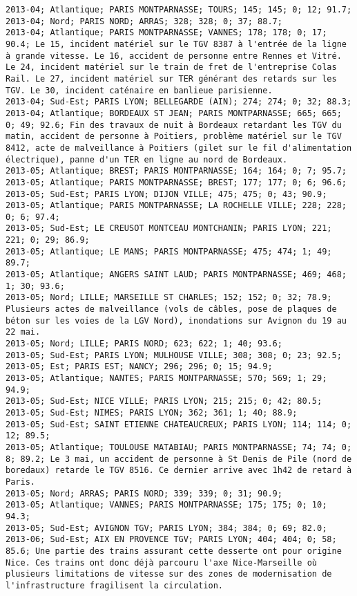 \documentclass{article}
\begin{document}
\begin{Verbatim}[commandchars=\\\{\}]
2013-04; Atlantique; PARIS MONTPARNASSE; TOURS; 145; 145; 0; 12; 91.7; 
2013-04; Nord; PARIS NORD; ARRAS; 328; 328; 0; 37; 88.7; 
2013-04; Atlantique; PARIS MONTPARNASSE; VANNES; 178; 178; 0; 17; 90.4; Le 15, incident matériel sur le TGV 8387 à l'entrée de la ligne à grande vitesse. Le 16, accident de personne entre Rennes et Vitré. Le 24, incident matériel sur le train de fret de l'entreprise Colas Rail. Le 27, incident matériel sur TER générant des retards sur les TGV. Le 30, incident caténaire en banlieue parisienne.
2013-04; Sud-Est; PARIS LYON; BELLEGARDE (AIN); 274; 274; 0; 32; 88.3; 
2013-04; Atlantique; BORDEAUX ST JEAN; PARIS MONTPARNASSE; 665; 665; 0; 49; 92.6; Fin des travaux de nuit à Bordeaux retardant les TGV du matin, accident de personne à Poitiers, problème matériel sur le TGV 8412, acte de malveillance à Poitiers (gilet sur le fil d'alimentation électrique), panne d'un TER en ligne au nord de Bordeaux.
2013-05; Atlantique; BREST; PARIS MONTPARNASSE; 164; 164; 0; 7; 95.7; 
2013-05; Atlantique; PARIS MONTPARNASSE; BREST; 177; 177; 0; 6; 96.6; 
2013-05; Sud-Est; PARIS LYON; DIJON VILLE; 475; 475; 0; 43; 90.9; 
2013-05; Atlantique; PARIS MONTPARNASSE; LA ROCHELLE VILLE; 228; 228; 0; 6; 97.4; 
2013-05; Sud-Est; LE CREUSOT MONTCEAU MONTCHANIN; PARIS LYON; 221; 221; 0; 29; 86.9; 
2013-05; Atlantique; LE MANS; PARIS MONTPARNASSE; 475; 474; 1; 49; 89.7; 
2013-05; Atlantique; ANGERS SAINT LAUD; PARIS MONTPARNASSE; 469; 468; 1; 30; 93.6; 
2013-05; Nord; LILLE; MARSEILLE ST CHARLES; 152; 152; 0; 32; 78.9; Plusieurs actes de malveillance (vols de câbles, pose de plaques de béton sur les voies de la LGV Nord), inondations sur Avignon du 19 au 22 mai.
2013-05; Nord; LILLE; PARIS NORD; 623; 622; 1; 40; 93.6; 
2013-05; Sud-Est; PARIS LYON; MULHOUSE VILLE; 308; 308; 0; 23; 92.5; 
2013-05; Est; PARIS EST; NANCY; 296; 296; 0; 15; 94.9; 
2013-05; Atlantique; NANTES; PARIS MONTPARNASSE; 570; 569; 1; 29; 94.9; 
2013-05; Sud-Est; NICE VILLE; PARIS LYON; 215; 215; 0; 42; 80.5; 
2013-05; Sud-Est; NIMES; PARIS LYON; 362; 361; 1; 40; 88.9; 
2013-05; Sud-Est; SAINT ETIENNE CHATEAUCREUX; PARIS LYON; 114; 114; 0; 12; 89.5; 
2013-05; Atlantique; TOULOUSE MATABIAU; PARIS MONTPARNASSE; 74; 74; 0; 8; 89.2; Le 3 mai, un accident de personne à St Denis de Pile (nord de boredaux) retarde le TGV 8516. Ce dernier arrive avec 1h42 de retard à Paris.
2013-05; Nord; ARRAS; PARIS NORD; 339; 339; 0; 31; 90.9; 
2013-05; Atlantique; VANNES; PARIS MONTPARNASSE; 175; 175; 0; 10; 94.3; 
2013-05; Sud-Est; AVIGNON TGV; PARIS LYON; 384; 384; 0; 69; 82.0; 
2013-06; Sud-Est; AIX EN PROVENCE TGV; PARIS LYON; 404; 404; 0; 58; 85.6; Une partie des trains assurant cette desserte ont pour origine Nice. Ces trains ont donc déjà parcouru l'axe Nice-Marseille où plusieurs limitations de vitesse sur des zones de modernisation de l'infrastructure fragilisent la circulation.

\end{Verbatim}
\end{document}
